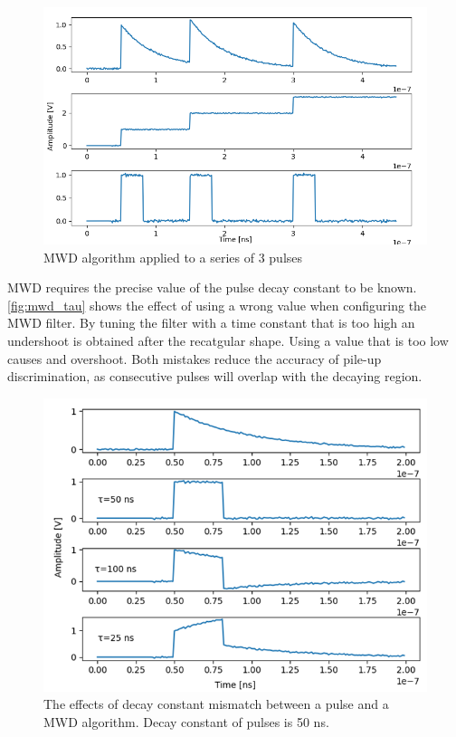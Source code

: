 \begin{figure}[H]
  \centering
  \includegraphics[width=\linewidth]{media/mwd_staircase.png}
  \caption{MWD algorithm applied to a series of 3 pulses}
  \label{fig:mwd_staircase} 
\end{figure}

MWD requires the precise value of the pulse decay constant to
be known. \autoref{fig:mwd_tau} shows the effect of using a wrong value
when configuring the MWD filter. By tuning the filter with a time constant
that is too high an undershoot is obtained after the recatgular shape.
Using a value that is too low causes and overshoot.
Both mistakes reduce the accuracy of pile-up discrimination, 
as consecutive pulses will overlap with the decaying region.

\begin{figure}[H]
  \centering
  \includegraphics[width=\linewidth]{media/mwd_tau.png}
  \caption{The effects of decay constant mismatch between a pulse and a MWD algorithm. Decay constant of pulses is 50 ns.}
  \label{fig:mwd_tau} 
\end{figure}

